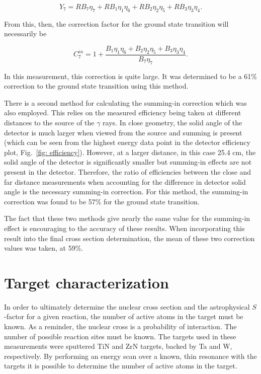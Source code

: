 \begin{equation}
Y_{7} = R B_{7} \eta_{7} + R B_{1} \eta_{1} \eta_{6} +  R B_{2} \eta_{2} \eta_{5} + R B_{3} \eta_{3} \eta_{4} .
\end{equation}

\noindent From this, then, the correction factor for the ground state transition will necessarily be

\begin{equation}
C_{7}^{in} = 1 + \dfrac{B_{1} \eta_{1} \eta_{6} + B_{2} \eta_{2} \eta_{5} + B_{3} \eta_{3} \eta_{4} }{B_{7} \eta_{7}}.
\end{equation}

\noindent In this measurement, this correction is quite large. It was determined to be a 61\% correction to the ground state transition using this method. 

There is a second method for calculating the summing-in correction which was also employed. This relies on the measured efficiency being taken at different distances to the source of the $\gamma$ rays. In close geometry, the solid angle of the detector is much larger when viewed from the source and summing is present (which can be seen from the highest energy data point in the detector efficiency plot, Fig.\ \ref{fig: efficiency}). However, at a larger distance, in this case 25.4 cm, the solid angle of the detector is significantly smaller but summing-in effects are not present in the detector. Therefore, the ratio of efficiencies between the close and far distance measurements when accounting for the difference in detector solid angle is the necessary summing-in correction. For this method, the summing-in correction was found to be 57\% for the ground state transition. 

The fact that these two methods give nearly the same value for the summing-in effect is encouraging to the accuracy of these results. When incorporating this result into the final cross section determination, the mean of these two correction values was taken, at 59\%. 






\section{Target characterization}
\label{sec: targetCharacterization}

In order to ultimately determine the nuclear cross section and the astrophysical $S$-factor for a given reaction, the number of active atoms in the target must be known. As a reminder, the nuclear cross is a probability of interaction. The number of possible reaction sites must be known. The targets used in these measurements were sputtered TiN and ZrN targets, backed by Ta and W, respectively. By performing an energy scan over a known, thin resonance with the targets it is possible to determine the number of active atoms in the target. 

